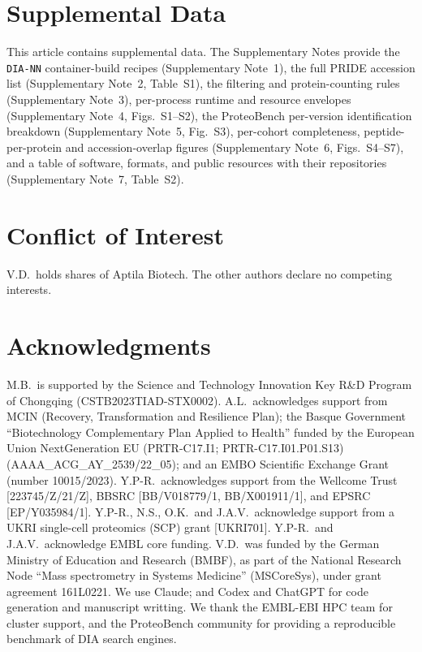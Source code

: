 \documentclass[preprint,12pt]{elsarticle}
\begin{document}
\section*{Supplemental Data}
This article contains supplemental data.
The Supplementary Notes provide the \texttt{DIA-NN} container-build recipes (Supplementary Note~1), the full PRIDE accession list (Supplementary Note~2, Table~S1), the filtering and protein-counting rules (Supplementary Note~3), per-process runtime and resource envelopes (Supplementary Note~4, Figs.~S1--S2), the ProteoBench per-version identification breakdown (Supplementary Note~5, Fig.~S3), per-cohort completeness, peptide-per-protein and accession-overlap figures (Supplementary Note~6, Figs.~S4--S7), and a table of software, formats, and public resources with their repositories (Supplementary Note~7, Table~S2).

\section*{Conflict of Interest}
V.D.\ holds shares of Aptila Biotech. The other authors declare no competing interests.

\section*{Acknowledgments}
M.B.\ is supported by the Science and Technology Innovation Key R\&D Program of Chongqing (CSTB2023TIAD-STX0002). A.L.\ acknowledges support from MCIN (Recovery, Transformation and Resilience Plan); the Basque Government ``Biotechnology Complementary Plan Applied to Health'' funded by the European Union NextGeneration EU (PRTR-C17.I1; PRTR-C17.I01.P01.S13) (AAAA\_ACG\_AY\_2539/22\_05); and an EMBO Scientific Exchange Grant (number 10015/2023). Y.P-R.\ acknowledges support from the Wellcome Trust [223745/Z/21/Z], BBSRC [BB/V018779/1, BB/X001911/1], and EPSRC [EP/Y035984/1]. Y.P-R., N.S., O.K.\ and J.A.V.\ acknowledge support from a UKRI single-cell proteomics (SCP) grant [UKRI701]. Y.P-R.\ and J.A.V.\ acknowledge EMBL core funding. V.D.\ was funded by the German Ministry of Education and Research (BMBF), as part of the National Research Node ``Mass spectrometry in Systems Medicine'' (MSCoreSys), under grant agreement 161L0221. We use Claude; and Codex and ChatGPT for code generation and manuscript writting. We thank the EMBL-EBI HPC team for cluster support, and the ProteoBench community for providing a reproducible benchmark of DIA search engines.
\end{document}
